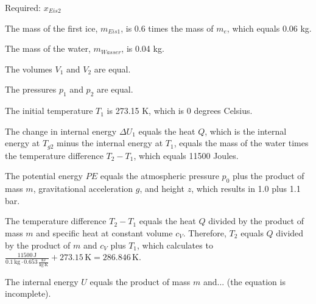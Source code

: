 Required: \( x_{Eis2} \)

The mass of the first ice, \( m_{Eis1} \), is 0.6 times the mass of \( m_e \), which equals 0.06 kg.

The mass of the water, \( m_{Wasser} \), is 0.04 kg.

The volumes \( V_1 \) and \( V_2 \) are equal.

The pressures \( p_1 \) and \( p_2 \) are equal.

The initial temperature \( T_1 \) is 273.15 K, which is 0 degrees Celsius.

The change in internal energy \( \Delta U_1 \) equals the heat \( Q \), which is the internal energy at \( T_{g2} \) minus the internal energy at \( T_1 \), equals the mass of the water times the temperature difference \( T_2 - T_1 \), which equals 11500 Joules.

The potential energy \( PE \) equals the atmospheric pressure \( p_0 \) plus the product of mass \( m \), gravitational acceleration \( g \), and height \( z \), which results in 1.0 plus 1.1 bar.

The temperature difference \( T_2 - T_1 \) equals the heat \( Q \) divided by the product of mass \( m \) and specific heat at constant volume \( c_V \). Therefore, \( T_2 \) equals \( Q \) divided by the product of \( m \) and \( c_V \) plus \( T_1 \), which calculates to \( \frac{11500 \, \text{J}}{0.1 \, \text{kg} \cdot 0.653 \, \frac{\text{kJ}}{\text{kg} \cdot \text{K}}} + 273.15 \, \text{K} = 286.846 \, \text{K} \).

The internal energy \( U \) equals the product of mass \( m \) and... (the equation is incomplete).